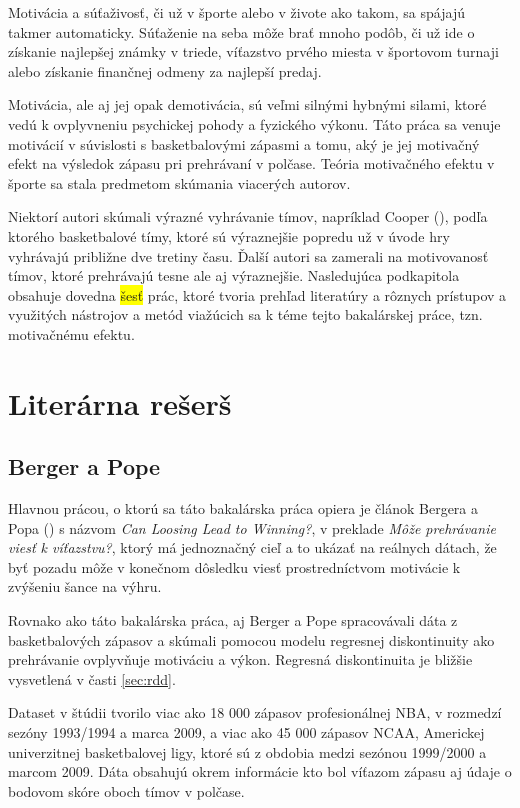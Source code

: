 \documentclass[
  digital, %
  twoside, %
  notable,   %
  lof,     %
  lot,     %
]{fithesis3}
\begin{document}
		Motivácia a súťaživosť, či už v športe alebo v živote ako takom, sa spájajú takmer automaticky. Súťaženie na seba môže brať mnoho podôb, či už ide o získanie najlepšej známky v triede, víťazstvo prvého miesta v športovom turnaji alebo získanie finančnej odmeny za najlepší predaj. \parencite[s.~210]{tauer1999}
		
		Motivácia, ale aj jej opak demotivácia, sú veľmi silnými hybnými silami, ktoré vedú k ovplyvneniu psychickej pohody a fyzického výkonu. Táto práca sa venuje motivácií v súvislosti s basketbalovými zápasmi a tomu, aký je jej motivačný efekt na výsledok zápasu pri prehrávaní v polčase. Teória motivačného efektu v športe sa stala predmetom skúmania viacerých autorov. 
		
		Niektorí autori skúmali výrazné vyhrávanie tímov, napríklad Cooper (\citeyear{cooper1992}), podľa ktorého basketbalové tímy, ktoré sú výraznejšie popredu už v úvode hry vyhrávajú približne dve tretiny času. Ďalší autori sa zamerali na motivovanosť tímov, ktoré prehrávajú tesne ale aj výraznejšie. Nasledujúca podkapitola obsahuje dovedna \colorbox{yellow}{šesť} prác, ktoré tvoria prehľad literatúry a rôznych prístupov a využitých nástrojov a metód viažúcich sa k téme tejto bakalárskej práce, tzn. motivačnému efektu. 
		
		\section{Literárna rešerš}
		\subsection{Berger a Pope}
		\label{sec:Berger}
		Hlavnou prácou, o ktorú sa táto bakalárska práca opiera je článok Bergera a Popa (\citeyear{berger2011}) s názvom \textit{Can Loosing Lead to Winning?}, v preklade \textit{Môže prehrávanie viesť k víťazstvu?}, ktorý má jednoznačný cieľ a to ukázať na reálnych dátach, že byť pozadu môže v konečnom dôsledku viesť prostredníctvom motivácie k zvýšeniu šance na výhru.
		
		Rovnako ako táto bakalárska práca, aj Berger a Pope spracovávali dáta z basketbalových zápasov a skúmali pomocou modelu regresnej diskontinuity ako prehrávanie ovplyvňuje motiváciu a výkon. Regresná diskontinuita je bližšie vysvetlená v časti \ref{sec:rdd}.
		
		Dataset v štúdii tvorilo viac ako 18 000 zápasov profesionálnej NBA, v rozmedzí sezóny 1993/1994 a marca 2009, a viac ako 45 000 zápasov NCAA, Americkej univerzitnej basketbalovej ligy, ktoré sú z obdobia medzi sezónou 1999/2000 a marcom 2009. \parencite[s.~818]{berger2011} Dáta obsahujú okrem informácie kto bol víťazom zápasu aj údaje o bodovom skóre oboch tímov v polčase.
		
\end{document}
